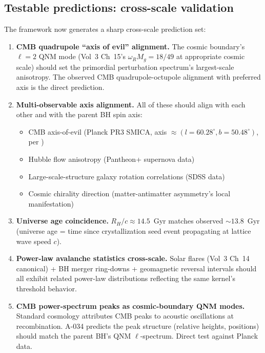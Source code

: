 \subsection{Testable predictions: cross-scale validation}

The framework now generates a sharp cross-scale prediction set:

\begin{enumerate}
    \item \textbf{CMB quadrupole ``axis of evil'' alignment.} The cosmic
    boundary's $\ell=2$ QNM mode (Vol~3 Ch~15's $\omega_R M_g = 18/49$ at
    appropriate cosmic scale) should set the primordial perturbation
    spectrum's largest-scale anisotropy. The observed CMB quadrupole-octupole
    alignment with preferred axis is the direct prediction.

    \item \textbf{Multi-observable axis alignment.} All of these should align
    with each other and with the parent BH spin axis:
    \begin{itemize}
        \item CMB axis-of-evil (Planck PR3 SMICA, axis $\approx (l=60.28^\circ, b=50.48^\circ)$, per )
        \item Hubble flow anisotropy (Pantheon+ supernova data)
        \item Large-scale-structure galaxy rotation correlations (SDSS data)
        \item Cosmic chirality direction (matter-antimatter asymmetry's local manifestation)
    \end{itemize}

    \item \textbf{Universe age coincidence.} $R_H / c \approx 14.5$~Gyr
    matches observed $\sim 13.8$~Gyr (universe age = time since
    crystallization seed event propagating at lattice wave speed $c$).

    \item \textbf{Power-law avalanche statistics cross-scale.} Solar flares
    (Vol~3 Ch~14 canonical) + BH merger ring-downs + geomagnetic reversal
    intervals should all exhibit related power-law distributions reflecting
    the same kernel's threshold behavior.

    \item \textbf{CMB power-spectrum peaks as cosmic-boundary QNM modes.}
    Standard cosmology attributes CMB peaks to acoustic oscillations at
    recombination. A-034 predicts the peak structure (relative heights,
    positions) should match the parent BH's QNM $\ell$-spectrum. Direct test
    against Planck data.
\end{enumerate}

